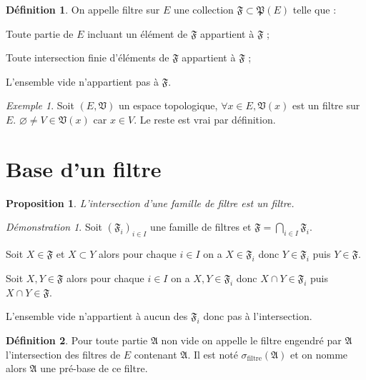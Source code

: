 \documentclass[a4paper, 11pt, french]{book}
\newenvironment{itemise}{\itemize}{\enditemize}
\theoremstyle{plain} %
\newtheorem{proposition}{Proposition}
\theoremstyle{definition} %
\newtheorem{definition}{Définition}
\theoremstyle{remark} %
\newtheorem{exemple}{Exemple}
\newtheorem*{demonstration}{Démonstration}
\newcommand{\1}{\mathds{1}}
\newcommand\vide{\varnothing}
\renewcommand{\frak}[1]{\mathfrak{#1}}
\begin{document}
\begin{definition}
	On appelle filtre sur $E$ une collection $\frak{F}\subset\frak{P}(E)$ telle que :
	\begin{itemise}
		\item Toute partie de $E$ incluant un élément de $\frak{F}$ appartient à $\frak{F}$ ;
		\item Toute intersection finie d'éléments de $\frak{F}$ appartient à $\frak{F}$ ;
		\item L'ensemble vide n'appartient pas à $\frak{F}$.
	\end{itemise}
\end{definition}

\begin{exemple}
	Soit $(E, \frak{V})$ un espace topologique, $\forall x\in E, \frak{V}(x)$ est un filtre sur $E$.
	$\vide\neq V\in\frak{V}(x)$ car $x\in V$.
	Le reste est vrai par définition.
\end{exemple}

\section{Base d'un filtre}

\begin{proposition}
	L'intersection d'une famille de filtre est un filtre.
\end{proposition}

\begin{demonstration}
	Soit $(\frak{F}_i)_{i\in I}$ une famille de filtres et $\frak{F}=\bigcap_{i\in I}\frak{F}_i$.
	\begin{itemise}
		\item Soit $X\in\frak{F}$ et $X\subset Y$ alors pour chaque $i\in I$ on a $X\in\frak{F}_i$ donc $Y\in\frak{F}_i$ puis $Y\in\frak{F}$.
		\item Soit $X, Y\in\frak{F}$ alors pour chaque $i\in I$ on a $X, Y\in\frak{F}_i$ donc $X\cap Y\in\frak{F}_i$ puis $X\cap Y\in\frak{F}$.
		\item L'ensemble vide n'appartient à aucun des $\frak{F}_i$ donc pas à l'intersection.
	\end{itemise}
\end{demonstration}

\begin{definition}
	Pour toute partie $\frak{A}$ non vide on appelle le filtre engendré par $\frak{A}$ l'intersection des filtres de $E$ contenant $\frak{A}$.
	Il est noté $\sigma_\text{filtre}(\frak{A})$ et on nomme alors $\frak{A}$ une pré-base de ce filtre.
\end{definition}
\end{document}

